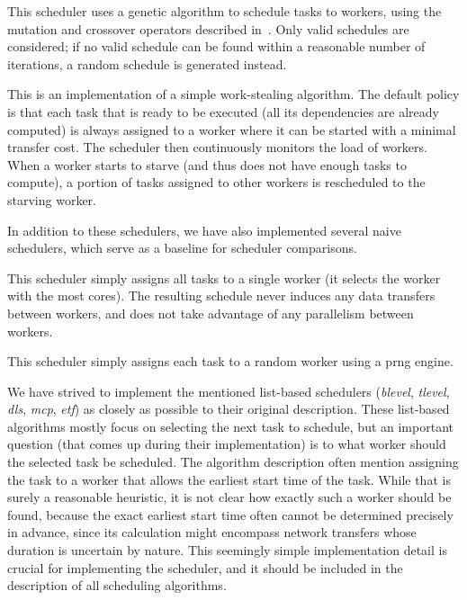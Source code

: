 \begin{description}[wide=0pt]
	\item[genetic]
		This scheduler uses a genetic algorithm to schedule tasks to workers, using the mutation and
		crossover operators described in~\cite{omara2009genetic}. Only valid schedules are considered; if no
		valid schedule can be found within a reasonable number of iterations, a random schedule is
		generated instead.

	\item[ws]
		This is an implementation of a simple work-stealing algorithm. The default policy is that each task
		that is ready to be executed (all its dependencies are already computed) is always assigned to a
		worker where it can be started with a minimal transfer cost. The scheduler then continuously
		monitors the load of workers. When a worker starts to starve (and thus does not have enough tasks
		to compute), a portion of tasks assigned to other workers is rescheduled to the starving worker.
\end{description}

In addition to these schedulers, we have also implemented several naive schedulers, which serve as
a baseline for scheduler comparisons.

\begin{description}[wide=0pt]
	\item[single]
		This scheduler simply assigns all tasks to a single worker (it selects the worker with the most
		cores). The resulting schedule never induces any data transfers between workers, and does not take
		advantage of any parallelism between workers.
	\item[random]
		This scheduler simply assigns each task to a random worker using a \gls{prng} engine.
\end{description}

We have strived to implement the mentioned list-based schedulers (\emph{blevel},
\emph{tlevel}, \emph{dls}, \emph{mcp}, \emph{etf})
as closely as possible to their original description. These list-based algorithms mostly focus on
selecting the next task to schedule, but an important question (that comes up during their
implementation) is to what worker should the selected task be scheduled. The algorithm description
often mention assigning the task to a worker that allows the earliest start time of the task. While
that is surely a reasonable heuristic, it is not clear how exactly such a worker should be found,
because the exact earliest start time often cannot be determined precisely in advance, since its
calculation might encompass network transfers whose duration is uncertain by nature. This seemingly
simple implementation detail is crucial for implementing the scheduler, and it should be included
in the description of all scheduling algorithms.

